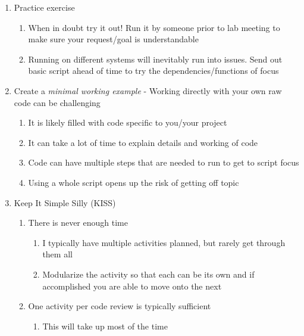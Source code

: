 \documentclass[
  11pt,
]{article}
\providecommand{\tightlist}{%
  \setlength{\itemsep}{0pt}\setlength{\parskip}{0pt}}
\begin{document}
\begin{enumerate}
\def\labelenumi{\arabic{enumi}.}
\setcounter{enumi}{1}
\tightlist
\item
  Practice exercise

  \begin{enumerate}
  \def\labelenumii{\alph{enumii}.}
  \tightlist
  \item
    When in doubt try it out! Run it by someone prior to lab meeting to
    make sure your request/goal is understandable
  \item
    Running on different systems will inevitably run into issues. Send
    out basic script ahead of time to try the dependencies/functions of
    focus
  \end{enumerate}
\item
  Create a \emph{minimal working example} - Working directly with your
  own raw code can be challenging

  \begin{enumerate}
  \def\labelenumii{\alph{enumii}.}
  \tightlist
  \item
    It is likely filled with code specific to you/your project
  \item
    It can take a lot of time to explain details and working of code
  \item
    Code can have multiple steps that are needed to run to get to script
    focus
  \item
    Using a whole script opens up the risk of getting off topic
  \end{enumerate}
\item
  Keep It Simple Silly (KISS)

  \begin{enumerate}
  \def\labelenumii{\alph{enumii}.}
  \tightlist
  \item
    There is never enough time

    \begin{enumerate}
    \def\labelenumiii{\roman{enumiii}.}
    \tightlist
    \item
      I typically have multiple activities planned, but rarely get
      through them all
    \item
      Modularize the activity so that each can be its own and if
      accomplished you are able to move onto the next
    \end{enumerate}
  \item
    One activity per code review is typically sufficient

    \begin{enumerate}
    \def\labelenumiii{\roman{enumiii}.}
    \tightlist
    \item
      This will take up most of the time


\end{enumerate}
\end{enumerate}
\end{enumerate}
\end{document}
